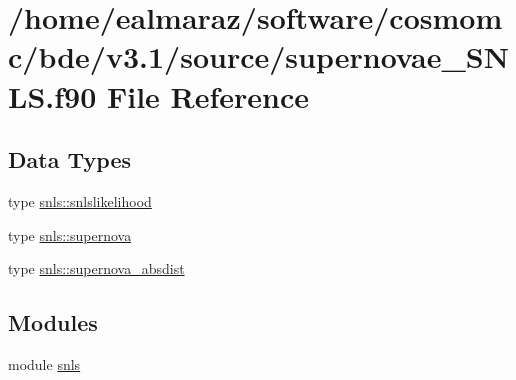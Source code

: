 \hypertarget{supernovae__SNLS_8f90}{}\section{/home/ealmaraz/software/cosmomc/bde/v3.1/source/supernovae\+\_\+\+S\+N\+LS.f90 File Reference}
\label{supernovae__SNLS_8f90}
\subsection*{Data Types}
\begin{DoxyCompactItemize}
\item 
type \mbox{\hyperlink{structsnls_1_1snlslikelihood}{snls\+::snlslikelihood}}
\item 
type \mbox{\hyperlink{structsnls_1_1supernova}{snls\+::supernova}}
\item 
type \mbox{\hyperlink{structsnls_1_1supernova__absdist}{snls\+::supernova\+\_\+absdist}}
\end{DoxyCompactItemize}
\subsection*{Modules}
\begin{DoxyCompactItemize}
\item 
module \mbox{\hyperlink{namespacesnls}{snls}}
\end{DoxyCompactItemize}
